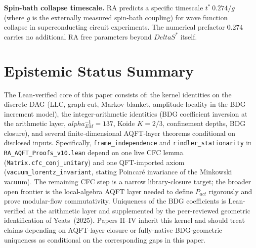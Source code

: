 \documentclass[11pt]{article}
\def\Delta{Delta}%
\def\alpha{alpha}%
\def\mathrm#1{#1}%
\def\approx{~}%
\begin{document}
\textbf{Spin-bath collapse timescale.} RA predicts a specific timescale $t^*\approx 0.274/g$ (where $g$ is the externally measured spin-bath coupling) for wave function collapse in superconducting circuit experiments. The numerical prefactor $0.274$ carries no additional RA free parameters beyond $\Delta S^*$ itself.

\section{Epistemic Status Summary}
\label{sec:status}

\begin{tcolorbox}[title=Scope of the Lean-verified layer,colback=gray!5,colframe=gray!60]
The Lean-verified core of this paper consists of: the kernel identities on the discrete DAG (LLC, graph-cut, Markov blanket, amplitude locality in the BDG increment model), the integer-arithmetic identities (BDG coefficient inversion at the arithmetic layer, $\alpha_{\mathrm{EM}}^{-1}=137$, Koide $K=2/3$, confinement depths, BDG closure), and several finite-dimensional AQFT-layer theorems conditional on disclosed inputs. Specifically, \texttt{frame\_independence} and \texttt{rindler\_stationarity} in \texttt{RA\_AQFT\_Proofs\_v10.lean} depend on one live CFC lemma (\texttt{Matrix.cfc\_conj\_unitary}) and one QFT-imported axiom (\texttt{vacuum\_lorentz\_invariant}, stating Poincar\'e invariance of the Minkowski vacuum). The remaining CFC step is a narrow library-closure target; the broader open frontier is the local-algebra AQFT layer needed to define \(P_{\mathrm{act}}\) rigorously and prove modular-flow commutativity. Uniqueness of the BDG coefficients is Lean-verified at the arithmetic layer and supplemented by the peer-reviewed geometric identification of Yeats~(2025). Papers II--IV inherit this kernel and should treat claims depending on AQFT-layer closure or fully-native BDG-geometric uniqueness as conditional on the corresponding gaps in this paper.
\end{tcolorbox}
\end{document}
